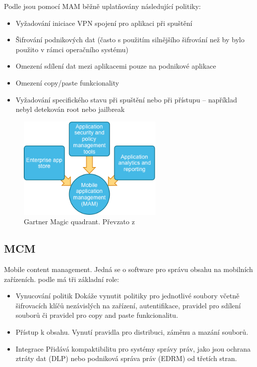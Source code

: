  Podle \cite{Gartner_EMM_2016} jsou pomocí MAM běžně uplatňovány následující politiky:
 \begin{itemize}
     \item Vyžadování iniciace VPN spojení pro aplikaci při spuštění
     \item Šifrování podnikových dat (často s použitím silnějšího šifrování než by bylo použito v rámci operačního systému)
     \item Omezení sdílení dat mezi aplikacemi pouze na podnikové aplikace
     \item Omezení copy/paste funkcionality
     \item Vyžadování specifického stavu při spuštění nebo při přístupu -- například nebyl detekován root nebo jailbreak
 \end{itemize}
 
  
\begin{figure}[h]
\centering
\includegraphics[width=7cm]{img/MAM-Offering}
\caption{Gartner Magic quadrant. Převzato z } 
\label{MAM:nacrt}
\end{figure}


\subsection{MCM} 
Mobile content management. Jedná se o software pro správu obsahu na mobilních zařízeních. podle \cite{Gartner_EMM_2016} má tři základní role:
\begin{itemize}
    \item Vynucování politik Dokáže vynutit politiky pro jednotlivé soubory včetně šifrovacích klíčů nezávislých na zařízení, autentifikace, pravidel pro sdílení souborů či pravidel pro copy and paste funkcionalitu.
    \item Přístup k obsahu. Vynutí pravidla pro distribuci, záměnu a mazání souborů.
    \item Integrace Přidává kompaktibilitu pro systémy správy práv, jako jsou ochrana ztráty dat (DLP) nebo podniková správa práv (EDRM) od třetích stran.
\end{itemize}
 
